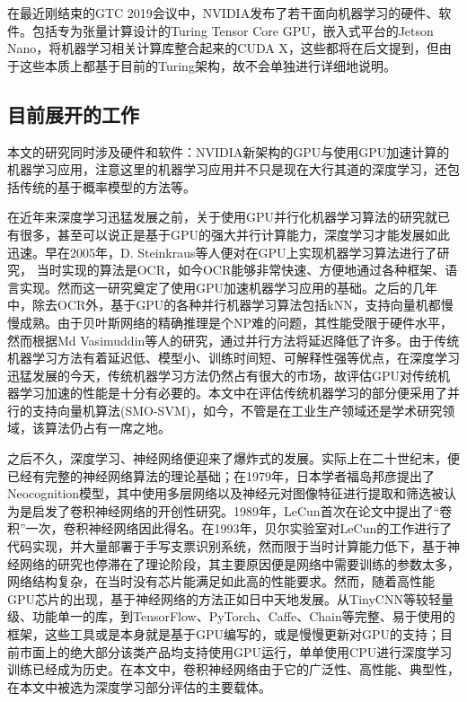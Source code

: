\par 在最近刚结束的GTC 2019会议中，NVIDIA发布了若干面向机器学习的硬件、软件。包括专为张量计算设计的Turing Tensor Core GPU，嵌入式平台的Jetson Nano\cite{JETSONNANO}，将机器学习相关计算库整合起来的CUDA X\cite{CUDAX}，这些都将在后文提到，但由于这些本质上都基于目前的Turing架构，故不会单独进行详细地说明。
\subsection{目前展开的工作}
\par 本文的研究同时涉及硬件和软件：NVIDIA新架构的GPU与使用GPU加速计算的机器学习应用，注意这里的机器学习应用并不只是现在大行其道的深度学习，还包括传统的基于概率模型的方法等。
\par 在近年来深度学习迅猛发展之前，关于使用GPU并行化机器学习算法的研究就已有很多，甚至可以说正是基于GPU的强大并行计算能力，深度学习才能发展如此迅速。早在2005年，D. Steinkraus等人便对在GPU上实现机器学习算法进行了研究， 当时实现的算法是OCR，如今OCR能够非常快速、方便地通过各种框架、语言实现。然而这一研究奠定了使用GPU加速机器学习应用的基础\cite{GPUFORML}。之后的几年中，除去OCR外，基于GPU的各种并行机器学习算法包括kNN\cite{KNNG}，支持向量机\cite{SMOSVM}都慢慢成熟。由于贝叶斯网络的精确推理是个NP难的问题，其性能受限于硬件水平，然而根据Md Vasimuddin等人的研究\cite{BAYESINF}，通过并行方法将延迟降低了许多。由于传统机器学习方法有着延迟低、模型小、训练时间短、可解释性强等优点，在深度学习迅猛发展的今天，传统机器学习方法仍然占有很大的市场，故评估GPU对传统机器学习加速的性能是十分有必要的。本文中在评估传统机器学习的部分便采用了并行的支持向量机算法(SMO-SVM)，如今，不管是在工业生产领域还是学术研究领域，该算法仍占有一席之地。
\par 之后不久，深度学习、神经网络便迎来了爆炸式的发展。实际上在二十世纪末，便已经有完整的神经网络算法的理论基础；在1979年，日本学者福岛邦彦提出了Neocognition模型，其中使用多层网络以及神经元对图像特征进行提取和筛选被认为是启发了卷积神经网络的开创性研究\cite{JAPANESSAY}。1989年，LeCun首次在论文中提出了“卷积”一次，卷积神经网络因此得名\cite{LENET}。在1993年，贝尔实验室对LeCun的工作进行了代码实现，并大量部署于手写支票识别系统，然而限于当时计算能力低下，基于神经网络的研究也停滞在了理论阶段，其主要原因便是网络中需要训练的参数太多，网络结构复杂，在当时没有芯片能满足如此高的性能要求\cite{NNML}。然而，随着高性能GPU芯片的出现，基于神经网络的方法正如日中天地发展。从TinyCNN等较轻量级、功能单一的库，到TensorFlow、PyTorch、Caffe、Chain等完整、易于使用的框架，这些工具或是本身就是基于GPU编写的，或是慢慢更新对GPU的支持；目前市面上的绝大部分该类产品均支持使用GPU运行，单单使用CPU进行深度学习训练已经成为历史。在本文中，卷积神经网络由于它的广泛性、高性能、典型性，在本文中被选为深度学习部分评估的主要载体。
